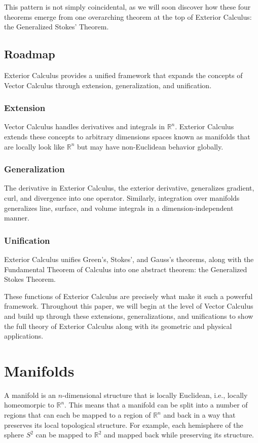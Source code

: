 \documentclass[12pt]{article}
\newcommand{\R}{\mathbb{R}}
\begin{document}
This pattern is not simply coincidental, as we will soon discover how these four theorems emerge from one overarching theorem at the top of Exterior Calculus: the Generalized Stokes' Theorem. 

\subsection{Roadmap}
Exterior Calculus provides a unified framework that expands the concepts of Vector Calculus through extension, generalization, and unification.
\subsubsection{Extension}
Vector Calculus handles derivatives and integrals in $\R^n$. Exterior Calculus extends these concepts to arbitrary dimensions spaces known as manifolds that are locally look like $\R^n$ but may have non-Euclidean behavior globally.
\subsubsection{Generalization}
The derivative in Exterior Calculus, the exterior derivative, generalizes gradient, curl, and divergence into one operator. Similarly, integration over manifolds generalizes line, surface, and volume integrals in a dimension-independent manner. 
\subsubsection{Unification}
Exterior Calculus unifies Green's, Stokes', and Gauss's theorems, along with the Fundamental Theorem of Calculus into one abstract theorem: the Generalized Stokes Theorem.

These functions of Exterior Calculus are precisely what make it such a powerful framework. Throughout this paper, we will begin at the level of Vector Calculus and build up through these extensions, generalizations, and unifications to show the full theory of Exterior Calculus along with its geometric and physical applications.


\section{Manifolds}

A manifold is an $n$-dimensional structure that is locally Euclidean, i.e., locally homeomorpic to $\R^n$. This means that a manifold can be split into a number of regions that can each be mapped to a region of $\R^n$ and back in a way that preserves its local topological structure. For example, each hemisphere of the sphere $S^2$ can be mapped to $\R^2$ and mapped back while preserving its structure. 
\end{document}
